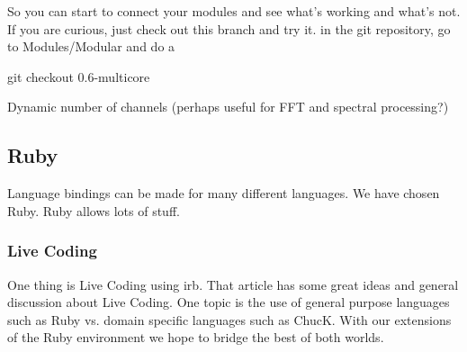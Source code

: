 \documentclass[twoside,a4paper]{article}
\begin{document}

So you can start to connect your modules and see what's working and 
what's not.
If you are curious, just check out this branch and try it.
in the git repository, go to Modules/Modular and do a

git checkout 0.6-multicore


Dynamic number of channels (perhaps useful for FFT and spectral processing?)





\subsection{Ruby} %

Language bindings can be made for many different languages.  We have chosen Ruby.  Ruby allows lots of stuff.  

\subsubsection{Live Coding} %

One thing is Live Coding \cite{Collins:2003} using irb.  That article has some great ideas and general discussion about Live Coding.  One topic is the use of general purpose languages such as Ruby vs. domain specific languages such as ChucK.  With our extensions of the Ruby environment we hope to bridge the best of both worlds.

\end{document}
